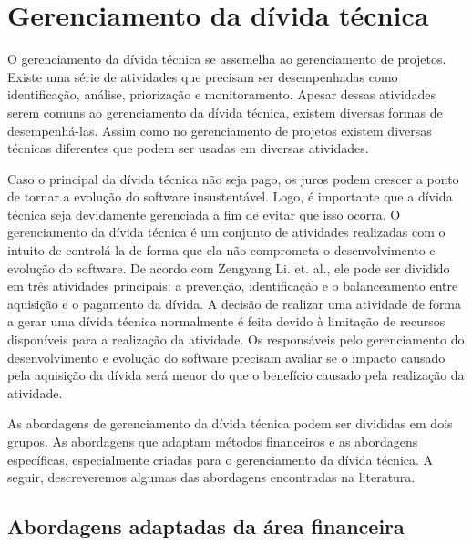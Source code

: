 \section{Gerenciamento da dívida técnica}

O gerenciamento da dívida técnica se assemelha ao gerenciamento de projetos. Existe uma série de atividades que precisam ser desempenhadas como identificação, análise, priorização e monitoramento. Apesar dessas atividades serem comuns ao gerenciamento da dívida técnica, existem diversas formas de desempenhá-las. Assim como no gerenciamento de projetos existem diversas técnicas diferentes que podem ser usadas em diversas atividades.

Caso o principal da dívida técnica não seja pago, os juros podem crescer a ponto de tornar a evolução do software insustentável. Logo, é importante que a dívida técnica seja devidamente gerenciada a fim de evitar que isso ocorra\cite{power2013understanding}. O gerenciamento da dívida técnica é um conjunto de atividades realizadas com o intuito de controlá-la de forma que ela não comprometa o desenvolvimento e evolução do software. De acordo com Zengyang Li. et. al.\cite{li2015systematic}, ele pode ser dividido em três atividades principais: a prevenção, identificação e o balanceamento entre aquisição e o pagamento da dívida.  A decisão de realizar uma atividade de forma a gerar uma dívida técnica normalmente é feita devido à limitação de recursos disponíveis para a realização da atividade.  Os responsáveis pelo gerenciamento do desenvolvimento e evolução do software precisam avaliar se o impacto causado pela aquisição da dívida será menor do que o benefício causado pela realização da atividade.  
 
As abordagens de gerenciamento da dívida técnica podem ser divididas em dois grupos. As abordagens que adaptam métodos financeiros e as abordagens específicas, especialmente criadas para o gerenciamento da dívida técnica. A seguir, descreveremos algumas das abordagens encontradas na literatura.


\subsection{Abordagens adaptadas da área financeira}

